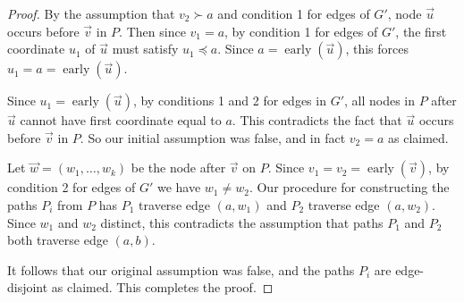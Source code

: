 \documentclass[11pt]{article}
\DeclareMathOperator{\early}{early}
\theoremstyle{definition}
\begin{document}
\begin{proof}
        By the assumption that $v_2\succ a$ and condition 1 for edges of $G'$, node $\vec{u}$ occurs before $\vec{v}$ in $P$.
        Then since $v_1 = a$, by condition 1 for edges of $G'$, the first coordinate $u_1$ of $\vec{u}$ must satisfy $u_1\preceq a$.
        Since $a = \early(\vec{u})$, this forces $u_1 = a = \early(\vec{u})$.

        Since $u_1 = \early(\vec{u})$,
        by conditions 1 and 2 for edges in $G'$, all nodes in $P$ after $\vec{u}$ cannot have first coordinate equal to $a$.
        This contradicts the fact that $\vec{u}$ occurs before $\vec{v}$ in $P$.
        So our initial assumption was false, and in fact $v_2 = a$ as claimed.

        Let $\vec{w} = (w_1, \dots, w_k)$ be the node after $\vec{v}$ on $P$.
        Since $v_1 = v_2 = \early(\vec{v})$, by condition 2 for edges of $G'$ we have $w_1\neq w_2$.
        Our procedure for constructing the paths $P_i$ from $P$ has $P_1$ traverse edge $(a,w_1)$ and $P_2$ traverse edge $(a,w_2)$.
        Since $w_1$ and $w_2$ distinct, this contradicts the assumption that paths $P_1$ and $P_2$ both traverse edge $(a,b)$.

        It follows that our original assumption was false, and the paths $P_i$ are edge-disjoint as claimed.
        This completes the proof.   
    \end{proof}

\end{document}
